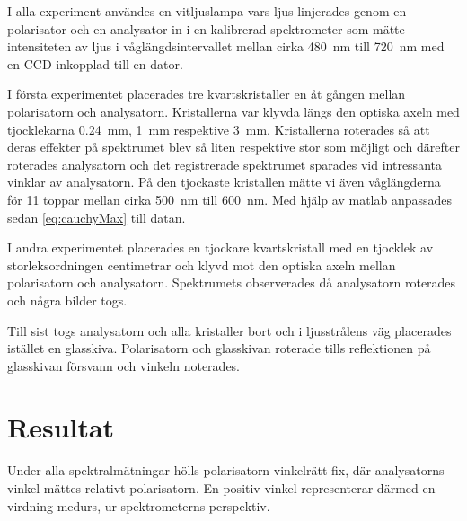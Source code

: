 \documentclass[a4paper]{article}
\begin{document}
  I alla experiment användes en vitljuslampa vars ljus linjerades genom en polarisator och en analysator in i en kalibrerad spektrometer som mätte intensiteten av ljus i våglängdsintervallet mellan cirka \SI{480}{\nano\meter} till \SI{720}{\nano\meter} med en CCD inkopplad till en dator.
  
  I första experimentet placerades tre kvartskristaller en åt gången mellan polarisatorn och analysatorn. Kristallerna var klyvda längs den optiska axeln med tjocklekarna \SI{0.24}{\milli\meter}, \SI{1}{\milli\meter} respektive \SI{3}{\milli\meter}. Kristallerna roterades så att deras effekter på spektrumet blev så liten respektive stor som möjligt och därefter roterades analysatorn och det registrerade spektrumet sparades vid intressanta vinklar av analysatorn. På den tjockaste kristallen mätte vi även våglängderna för 11 toppar mellan cirka \SI{500}{\nano\meter} till \SI{600}{\nano\meter}. Med hjälp av matlab anpassades sedan \eqref{eq:cauchyMax} till datan.
  
  I andra experimentet placerades en tjockare kvartskristall med en tjocklek av storleksordningen centimetrar och klyvd mot den optiska axeln mellan polarisatorn och analysatorn. Spektrumets observerades då analysatorn roterades och några bilder togs.
  
  Till sist togs analysatorn och alla kristaller bort och i ljusstrålens väg placerades istället en glasskiva. Polarisatorn och glasskivan roterade tills reflektionen på glasskivan försvann och vinkeln noterades.

\section{Resultat}




Under alla spektralmätningar hölls polarisatorn vinkelrätt fix, där analysatorns vinkel mättes relativt polarisatorn. En positiv vinkel representerar därmed en virdning medurs, ur spektrometerns perspektiv.
\end{document}
